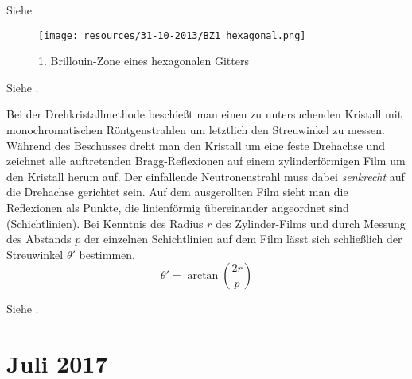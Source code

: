 \label{q:74}

Siehe .

\label{q:75}

\begin{figure}[H]
    \centering
    \begin{samepage}
        \texttt{[image: resources/31-10-2013/BZ1\_hexagonal.png]}
        \caption{1. Brillouin-Zone eines hexagonalen Gitters}
    \end{samepage}
\end{figure}

\label{q:76}

Siehe .

\label{q:77}

Bei der Drehkristallmethode beschießt man einen zu untersuchenden Kristall mit monochromatischen Röntgenstrahlen um letztlich den Streuwinkel zu messen. Während des Beschusses dreht man den Kristall um eine feste Drehachse und zeichnet alle auftretenden Bragg-Reflexionen auf einem zylinderförmigen Film um den Kristall herum auf. Der einfallende Neutronenstrahl muss dabei \textit{senkrecht} auf die Drehachse gerichtet sein. Auf dem ausgerollten Film sieht man die Reflexionen als Punkte, die linienförmig übereinander angeordnet sind (Schichtlinien). Bei Kenntnis des Radius $r$ des Zylinder-Films und durch Messung des Abstands $p$ der einzelnen Schichtlinien auf dem Film lässt sich schließlich der Streuwinkel $\theta'$ bestimmen.
\begin{equation}
    \label{eq:drehkristallmethode}
    \theta' = \arctan\left(\frac{2r}{p}\right)
\end{equation}

\label{q:78}

Siehe .

\newpage
\section{Juli 2017}

\label{q:79}

